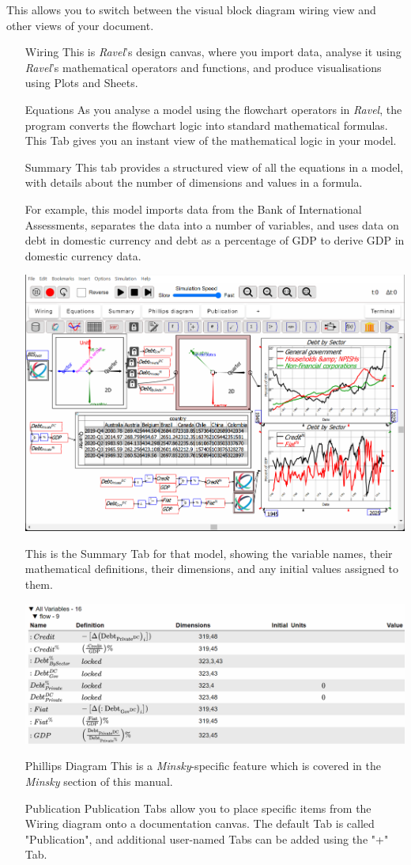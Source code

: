 This allows you to switch between the visual block diagram wiring
view and other views of your document.
\begin{itemize}
\item[Wiring] This is \emph{Ravel}'s design canvas, where you import data, analyse
it using \emph{Ravel}'s mathematical operators and functions, and
produce visualisations using Plots and Sheets. 
\item[Equations] As you analyse a model using the flowchart operators in \emph{Ravel},
the program converts the flowchart logic into standard mathematical
formulas. This Tab gives you an instant view of the mathematical logic
in your model. 
\item[Summary] This tab provides a structured view of all the equations in a model,
with details about the number of dimensions and values in a formula.

For example, this model imports data from the Bank of International
Assessments, separates the data into a number of variables, and uses
data on debt in domestic currency and debt as a percentage of GDP
to derive GDP in domestic currency data.

\includegraphics[width=15cm]{images/DebtCalcGDPexample}

This is the Summary Tab for that model, showing the variable names,
their mathematical definitions, their dimensions, and any initial
values assigned to them.

\includegraphics[width=15cm]{images/DebtCalcGDPexampleSummaryTab}
\item[Phillips Diagram] This is a \emph{Minsky}-specific feature which is covered in the
\emph{Minsky} section of this manual. 
\item[Publication] Publication Tabs allow you to place specific items from the Wiring
diagram onto a documentation canvas. The default Tab is called "Publication",
and additional user-named Tabs can be added using the "+" Tab.


\end{itemize}
